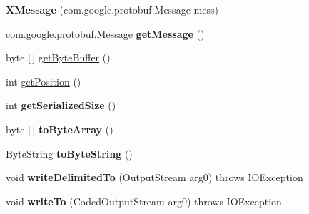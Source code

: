 \begin{DoxyCompactItemize}
\item 
\mbox{\label{classcom_1_1mysql_1_1cj_1_1protocol_1_1x_1_1_x_message_accb9da3722bf4c2d4aa5a2a8b4ee2148}} 
{\bfseries X\+Message} (com.\+google.\+protobuf.\+Message mess)
\item 
\mbox{\label{classcom_1_1mysql_1_1cj_1_1protocol_1_1x_1_1_x_message_aeee423ecdd94a3b495e3dd9ccb8778d4}} 
com.\+google.\+protobuf.\+Message {\bfseries get\+Message} ()
\item 
byte \mbox{[}$\,$\mbox{]} \mbox{\hyperlink{classcom_1_1mysql_1_1cj_1_1protocol_1_1x_1_1_x_message_ae2dfe8871615d85dbd7a8a7320a5025a}{get\+Byte\+Buffer}} ()
\item 
int \mbox{\hyperlink{classcom_1_1mysql_1_1cj_1_1protocol_1_1x_1_1_x_message_a5aa5c54128a10a7280a2113c4e24aeb9}{get\+Position}} ()
\item 
\mbox{\label{classcom_1_1mysql_1_1cj_1_1protocol_1_1x_1_1_x_message_a9cdfba2d664db579fff825d5e8bc3001}} 
int {\bfseries get\+Serialized\+Size} ()
\item 
\mbox{\label{classcom_1_1mysql_1_1cj_1_1protocol_1_1x_1_1_x_message_aa3ee6552484b870aa7f5653807394509}} 
byte \mbox{[}$\,$\mbox{]} {\bfseries to\+Byte\+Array} ()
\item 
\mbox{\label{classcom_1_1mysql_1_1cj_1_1protocol_1_1x_1_1_x_message_a646e0cdb01008b965425e68ce6a3c5a3}} 
Byte\+String {\bfseries to\+Byte\+String} ()
\item 
\mbox{\label{classcom_1_1mysql_1_1cj_1_1protocol_1_1x_1_1_x_message_a6e17de9d1c1c498712542be2a1fca39a}} 
void {\bfseries write\+Delimited\+To} (Output\+Stream arg0)  throws I\+O\+Exception 
\item 
\mbox{\label{classcom_1_1mysql_1_1cj_1_1protocol_1_1x_1_1_x_message_a2e63f386593e452821ee6df4b81a8296}} 
void {\bfseries write\+To} (Coded\+Output\+Stream arg0)  throws I\+O\+Exception 

\end{DoxyCompactItemize}
